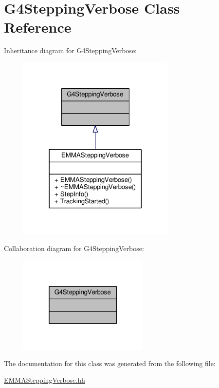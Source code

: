 \hypertarget{classG4SteppingVerbose}{}\section{G4\+Stepping\+Verbose Class Reference}
\label{classG4SteppingVerbose}


Inheritance diagram for G4\+Stepping\+Verbose\+:
\nopagebreak
\begin{figure}[H]
\begin{center}
\leavevmode
\includegraphics[width=222pt]{classG4SteppingVerbose__inherit__graph}
\end{center}
\end{figure}


Collaboration diagram for G4\+Stepping\+Verbose\+:
\nopagebreak
\begin{figure}[H]
\begin{center}
\leavevmode
\includegraphics[width=184pt]{classG4SteppingVerbose__coll__graph}
\end{center}
\end{figure}


The documentation for this class was generated from the following file\+:\begin{DoxyCompactItemize}
\item 
\hyperlink{EMMASteppingVerbose_8hh}{E\+M\+M\+A\+Stepping\+Verbose.\+hh}\end{DoxyCompactItemize}
